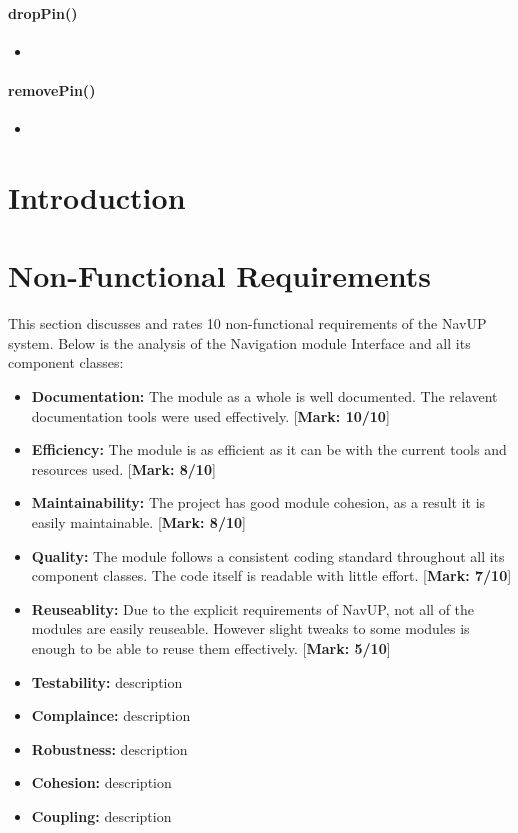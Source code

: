 \documentclass[runningheads,a4paper]{article}
\begin{document}
	\paragraph{dropPin()}
	\begin{itemize}
	\item
	\end{itemize}
	
	\paragraph{removePin()}
	\begin{itemize}
	\item
	\end{itemize}
	
\newpage

\section{Introduction}

	\section{Non-Functional Requirements}
	
	This section discusses and rates 10 non-functional requirements of the NavUP system.
	Below is the analysis of the Navigation module Interface and all its component classes:
	
	\begin{itemize}
		\item \textbf{Documentation:}
			The module as a whole is well documented. The relavent documentation tools were used effectively. [\textbf{Mark: 10/10}]
			
		\item \textbf{Efficiency:} The module is as efficient as it can be with the current tools and resources used. [\textbf{Mark: 8/10}]
		
		\item \textbf{Maintainability:} The project has good module cohesion, as a result it is easily maintainable. [\textbf{Mark: 8/10}]
		
		\item \textbf{Quality:} The module follows a consistent coding standard throughout all its component classes. The code itself is readable with little effort. [\textbf{Mark: 7/10}]
		
		\item \textbf{Reuseablity:} Due to the explicit requirements of NavUP, not all of the modules are easily reuseable. However slight tweaks to some modules is enough to be able to reuse them effectively. [\textbf{Mark: 5/10}]
		
		\item \textbf{Testability:} description
		\item \textbf{Complaince:} description
		\item \textbf{Robustness:} description
		\item \textbf{Cohesion:} description
		\item \textbf{Coupling:} description\\
		
	\end{itemize}
	

\end{document}
